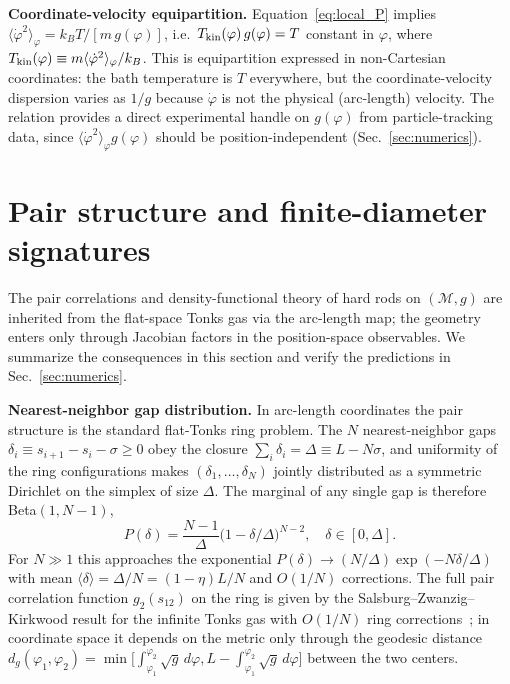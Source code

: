 \documentclass[aps,pre,twocolumn,superscriptaddress,longbibliography,floatfix]{revtex4-2}
\begin{document}
\textbf{Coordinate-velocity equipartition.}
Equation~\eqref{eq:local_P} implies $\langle\dot\varphi^2\rangle_\varphi=k_BT/[m\,g(\varphi)]$,
i.e.\ $T_{\rm kin}(\varphi)\,g(\varphi)=T$ constant in $\varphi$, where
$T_{\rm kin}(\varphi)\equiv m\langle\dot\varphi^2\rangle_\varphi/k_B$.
This is equipartition expressed in non-Cartesian coordinates: the bath temperature is $T$
everywhere, but the coordinate-velocity dispersion varies as $1/g$ because $\dot\varphi$ is
not the physical (arc-length) velocity.
The relation provides a direct experimental handle on $g(\varphi)$ from particle-tracking
data, since $\langle\dot\varphi^2\rangle_\varphi g(\varphi)$ should be position-independent
(Sec.~\ref{sec:numerics}).
\label{eq:Tkin}


\section{Pair structure and finite-diameter signatures}
\label{sec:pair}

The pair correlations and density-functional theory of hard rods on $(\mathcal{M},g)$ are
inherited from the flat-space Tonks gas via the arc-length map; the geometry enters only
through Jacobian factors in the position-space observables.
We summarize the consequences in this section and verify the predictions in
Sec.~\ref{sec:numerics}.

\textbf{Nearest-neighbor gap distribution.}
In arc-length coordinates the pair structure is the standard flat-Tonks ring problem.
The $N$ nearest-neighbor gaps $\delta_i\equiv s_{i+1}-s_i-\sigma\geq 0$ obey the closure
$\sum_i\delta_i=\Delta\equiv L-N\sigma$, and uniformity of the ring configurations
makes $(\delta_1,\dots,\delta_N)$ jointly distributed as a symmetric Dirichlet on the
simplex of size $\Delta$.
The marginal of any single gap is therefore Beta$(1,N-1)$,
\begin{equation}
  P(\delta) = \frac{N-1}{\Delta}\bigl(1-\delta/\Delta\bigr)^{N-2},\quad \delta\in[0,\Delta].
  \label{eq:gap_dist}
\end{equation}
For $N\gg 1$ this approaches the exponential
$P(\delta)\to (N/\Delta)\exp(-N\delta/\Delta)$ with mean $\langle\delta\rangle=\Delta/N=(1-\eta)L/N$
and $O(1/N)$ corrections.
The full pair correlation function $g_2(s_{12})$ on the ring is given by the
Salsburg--Zwanzig--Kirkwood result for the infinite Tonks gas with $O(1/N)$ ring
corrections~\cite{SalsburgZwanzigKirkwood1953}; in coordinate space it depends on the
metric only through the geodesic distance
$d_g(\varphi_1,\varphi_2)=\min\bigl[\int_{\varphi_1}^{\varphi_2}\!\sqrt{g}\,d\varphi,
L-\int_{\varphi_1}^{\varphi_2}\!\sqrt{g}\,d\varphi\bigr]$ between the two centers.
\end{document}
